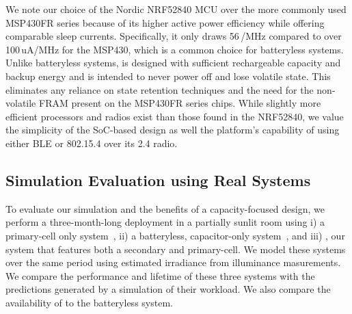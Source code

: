 We note our choice of the Nordic NRF52840 MCU over the more commonly used MSP430FR series
because of its higher active power efficiency while offering comparable sleep currents.
Specifically, it only draws 56\,\uA/MHz compared to over 100\,uA/MHz
for the MSP430, which is a common choice for batteryless systems. 
Unlike batteryless systems,
\name is designed with sufficient rechargeable capacity and backup energy and is intended to never power off and lose volatile state. 
This eliminates any reliance on state retention techniques and the need for the non-volatile FRAM present on the MSP430FR series chips. 
While
slightly more efficient
processors and radios exist than those found in the NRF52840,
we value the simplicity of the SoC-based design as well the platform's capability of using either BLE or 802.15.4 over its 2.4\ssi{\giga\hertz} radio.  

\subsection{Simulation Evaluation using Real Systems}
\label{sec:eval}
To evaluate our simulation and the benefits of a capacity-focused design, 
we perform a three-month-long deployment in a partially sunlit room
using i) a primary-cell only system~\cite{adkins2015michigan}, ii) a batteryless, capacitor-only system~\cite{campbellEnergy14}, and iii) \name, our
system that features both a secondary and primary-cell. 
We model these
systems over the same period using estimated irradiance from \name illuminance masurements. 
We compare the performance and lifetime of these three systems with the predictions generated by a simulation of their workload. 
We also compare the availability of \name to the batteryless system.


